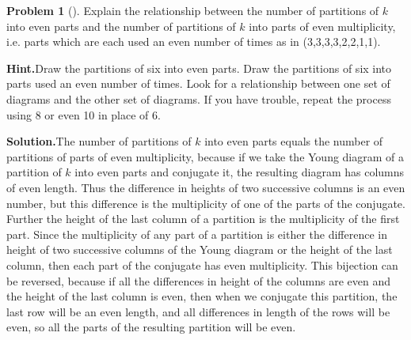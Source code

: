 \documentclass[10pt,]{book}
\theoremstyle{plain}
\theoremstyle{definition}
\newtheorem{activity}[project]{Problem}
\theoremstyle{definition}
\numberwithin{equation}{chapter}
\begin{document}
\begin{activity}[]\label{partition-even-mult-even-use}
Explain the relationship between the number of partitions of \(k\) into even parts and the number of partitions of \(k\) into parts of even multiplicity, i.e. parts which are each used an even number of times as in (3,3,3,3,2,2,1,1).%
\par\medskip\noindent%
\textbf{Hint.}\quad Draw the partitions of six into even parts. Draw the partitions of six into parts used an even number of times. Look for a relationship between one set of diagrams and the other set of diagrams. If you have trouble, repeat the process using 8 or even 10 in place of 6.%
\par\medskip\noindent%
\textbf{Solution.}\quad The number of partitions of \(k\) into even parts equals the number of partitions of parts of even multiplicity, because if we take the Young diagram of a partition of \(k\) into even parts and conjugate it, the resulting diagram has columns of even length. Thus the difference in heights of two successive columns is an even number, but this difference is the multiplicity of one of the parts of the conjugate. Further the height of the last column of a partition is the multiplicity of the first part. Since the multiplicity of any part of a partition is either the difference in height of two successive columns of the Young diagram or the height of the last column, then each part of the conjugate has even multiplicity. This bijection can be reversed, because if all the differences in height of the columns are even and the height of the last column is even, then when we conjugate this partition, the last row will be an even length, and all differences in length of the rows will be even, so all the parts of the resulting partition will be even.%
\end{activity}
\end{document}
